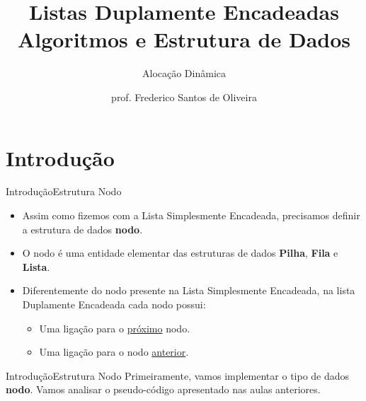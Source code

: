 \documentclass[aspectratio=169]{beamer}
\title[Aula Prática Listas]{Listas Duplamente Encadeadas\\
   Algoritmos e Estrutura de Dados}
\subtitle{Alocação Dinâmica}
\author[Frederico Santos de Oliveira]{prof. Frederico Santos de Oliveira}
\institute[UFMT]{Universidade Federal de Mato Grosso\\ Instituto de Engenharia}
\date{}
\begin{document}

\begin{frame}[plain]
  \titlepage
\end{frame}

%


\section{Introdução}

\begin{frame}{Introdução}{Estrutura Nodo}
\begin{itemize}
 \item Assim como fizemos com a Lista Simplesmente Encadeada, precisamos definir a estrutura de dados {\bf nodo}.
 \item O nodo é uma entidade elementar das estruturas de dados {\bf Pilha}, {\bf Fila} e {\bf Lista}. 
 \item  Diferentemente do nodo presente na Lista Simplesmente Encadeada, na lista Duplamente Encadeada cada nodo possui:
 \begin{itemize}  
 \item Uma ligação para o \underline{próximo} nodo.
 \item Uma ligação para o nodo \underline{anterior}.
 \end{itemize}
\end{itemize}
\end{frame}



\begin{frame}[fragile]{Introdução}{Estrutura Nodo}
Primeiramente, vamos implementar o tipo de dados {\bf nodo}. Vamos analisar o pseudo-código apresentado nas aulas anteriores.
\end{frame}


\end{document}
